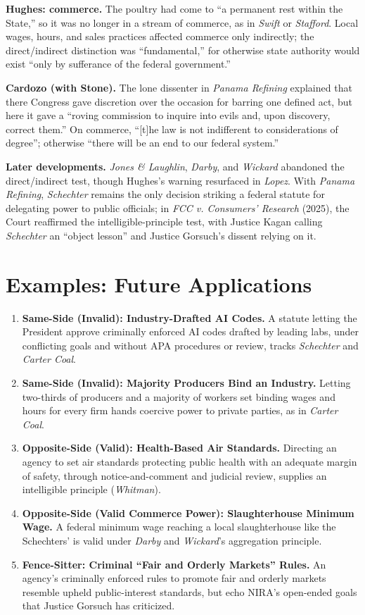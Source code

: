 \documentclass[12pt]{article}
\begin{document}
\textbf{Hughes: commerce.} The poultry had come to ``a permanent rest within the State,'' so it was no longer in a stream of commerce, as in \textit{Swift} or \textit{Stafford}. Local wages, hours, and sales practices affected commerce only indirectly; the direct/indirect distinction was ``fundamental,'' for otherwise state authority would exist ``only by sufferance of the federal government.''

\textbf{Cardozo (with Stone).} The lone dissenter in \textit{Panama Refining} explained that there Congress gave discretion over the occasion for barring one defined act, but here it gave a ``roving commission to inquire into evils and, upon discovery, correct them.'' On commerce, ``[t]he law is not indifferent to considerations of degree''; otherwise ``there will be an end to our federal system.''

\textbf{Later developments.} \textit{Jones \& Laughlin}, \textit{Darby}, and \textit{Wickard} abandoned the direct/indirect test, though Hughes's warning resurfaced in \textit{Lopez}. With \textit{Panama Refining}, \textit{Schechter} remains the only decision striking a federal statute for delegating power to public officials; in \textit{FCC v. Consumers' Research} (2025), the Court reaffirmed the intelligible-principle test, with Justice Kagan calling \textit{Schechter} an ``object lesson'' and Justice Gorsuch's dissent relying on it.

\section{Examples: Future Applications}

\begin{enumerate}
\item \textbf{Same-Side (Invalid): Industry-Drafted AI Codes.} A statute letting the President approve criminally enforced AI codes drafted by leading labs, under conflicting goals and without APA procedures or review, tracks \textit{Schechter} and \textit{Carter Coal}.
\item \textbf{Same-Side (Invalid): Majority Producers Bind an Industry.} Letting two-thirds of producers and a majority of workers set binding wages and hours for every firm hands coercive power to private parties, as in \textit{Carter Coal}.
\item \textbf{Opposite-Side (Valid): Health-Based Air Standards.} Directing an agency to set air standards protecting public health with an adequate margin of safety, through notice-and-comment and judicial review, supplies an intelligible principle (\textit{Whitman}).
\item \textbf{Opposite-Side (Valid Commerce Power): Slaughterhouse Minimum Wage.} A federal minimum wage reaching a local slaughterhouse like the Schechters' is valid under \textit{Darby} and \textit{Wickard}'s aggregation principle.
\item \textbf{Fence-Sitter: Criminal ``Fair and Orderly Markets'' Rules.} An agency's criminally enforced rules to promote fair and orderly markets resemble upheld public-interest standards, but echo NIRA's open-ended goals that Justice Gorsuch has criticized.
\end{enumerate}
\end{document}
